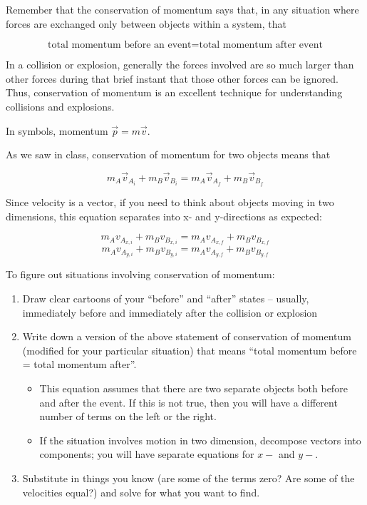 \documentclass[12pt]{article}
\begin{document}
	\Large
	\centerline{}
	
	\normalsize
	\centerline{}
	
			
		
Remember that the conservation of momentum says that, in any situation where forces are exchanged only between objects within a system, that

$$\text{total momentum before an event} = \text {total momentum after event}$$

In a collision or explosion, generally the forces involved are so much larger than other forces during that brief instant that those other forces can be ignored. Thus, conservation of momentum is an excellent technique for understanding collisions and explosions.

In symbols, momentum $\vec p = m \vec v$.

As we saw in class, conservation of momentum for two objects means that

$$m_A \vec v_{A_i} + m_B \vec v_{B_i} = m_A \vec v_{A_f} + m_B \vec v_{B_f}$$

Since velocity is a vector, if you need to think about objects moving in two dimensions, this equation
separates into x- and y-directions as expected:

$$m_A v_{A_{x,i}} + m_B v_{B_{x,i}} = m_A v_{A_{x,f}} + m_B v_{B_{x,f}}$$
$$m_A v_{A_{y,i}} + m_B v_{B_{y,i}} = m_A v_{A_{y,f}} + m_B v_{B_{y,f}}$$


To figure out situations involving conservation of momentum:

\begin{enumerate}
	\item Draw clear cartoons of your ``before'' and ``after'' states -- usually, immediately before and immediately after the collision or explosion
	\item Write down a version of the above statement of conservation of momentum (modified for your particular situation) that means ``total momentum before = total momentum after''.
	\begin{itemize}
		\item This equation assumes that there are two separate objects both before and after the event. If this is not true, then you will have a different number of terms on the left or the right.
		\item If the situation involves motion in two dimension, decompose vectors into components; you will have separate equations for $x-$ and $y-$.
	\end{itemize}
	\item Substitute in things you know (are some of the terms zero? Are some of the velocities equal?) and solve for what you want to find.
\end{enumerate}
\end{document}

